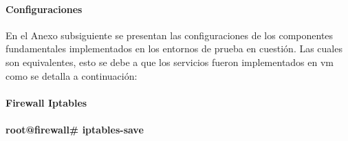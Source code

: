 \documentclass[a4paper,12pt]{report}
\begin{document}
\paragraph{Configuraciones\\}
En el Anexo subsiguiente se presentan las configuraciones de los
componentes fundamentales implementados en los entornos de prueba en
cuestión. Las cuales son equivalentes, esto se debe a que los servicios fueron
implementados en \ac{vm} como se detalla a continuación:

\paragraph{Firewall Iptables}

\paragraph{root@firewall\# iptables-save}
\end{document}
